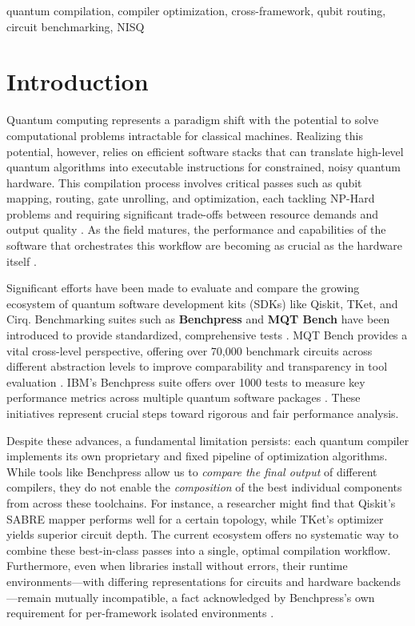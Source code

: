 \documentclass[conference]{IEEEtran}
\begin{document}
\begin{IEEEkeywords}
quantum compilation, compiler optimization, cross-framework, qubit routing, circuit benchmarking, NISQ
\end{IEEEkeywords}


\section{Introduction}

Quantum computing represents a paradigm shift with the potential to solve computational problems intractable for classical machines. Realizing this potential, however, relies on efficient software stacks that can translate high-level quantum algorithms into executable instructions for constrained, noisy quantum hardware. This compilation process involves critical passes such as qubit mapping, routing, gate unrolling, and optimization, each tackling NP-Hard problems and requiring significant trade-offs between resource demands and output quality \cite{siraichi2018qubit}. As the field matures, the performance and capabilities of the software that orchestrates this workflow are becoming as crucial as the hardware itself \cite{preskill2018quantum}.

Significant efforts have been made to evaluate and compare the growing ecosystem of quantum software development kits (SDKs) like Qiskit, TKet, and Cirq. Benchmarking suites such as \textbf{Benchpress} and \textbf{MQT Bench} have been introduced to provide standardized, comprehensive tests \cite{benchpress}. MQT Bench provides a vital cross-level perspective, offering over 70,000 benchmark circuits across different abstraction levels to improve comparability and transparency in tool evaluation \cite{quetschlich2023mqtbench}. IBM's Benchpress suite offers over 1000 tests to measure key performance metrics across multiple quantum software packages \cite{mqt}. These initiatives represent crucial steps toward rigorous and fair performance analysis.

Despite these advances, a fundamental limitation persists: each quantum compiler implements its own proprietary and fixed pipeline of optimization algorithms. While tools like Benchpress allow us to \textit{compare the final output} of different compilers, they do not enable the \textit{composition} of the best individual components from across these toolchains. For instance, a researcher might find that Qiskit's SABRE mapper performs well for a certain topology, while TKet's optimizer yields superior circuit depth. The current ecosystem offers no systematic way to combine these best-in-class passes into a single, optimal compilation workflow. Furthermore, even when libraries install without errors, their runtime environments—with differing representations for circuits and hardware backends—remain mutually incompatible, a fact acknowledged by Benchpress's own requirement for per-framework isolated environments \cite{benchpress}.
\end{document}
